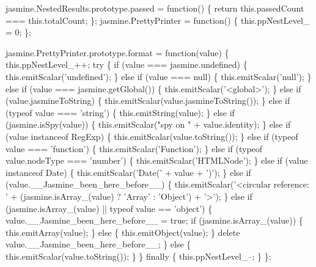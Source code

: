 \begin{DoxyCodeInclude}
jasmine.NestedResults.prototype.passed = \textcolor{keyword}{function}() \{
  \textcolor{keywordflow}{return} this.passedCount === this.totalCount;
\};
jasmine.PrettyPrinter = \textcolor{keyword}{function}() \{
  this.ppNestLevel\_ = 0;
\};

jasmine.PrettyPrinter.prototype.format = \textcolor{keyword}{function}(value) \{
  this.ppNestLevel\_++;
  \textcolor{keywordflow}{try} \{
    \textcolor{keywordflow}{if} (value === jasmine.undefined) \{
      this.emitScalar(\textcolor{stringliteral}{'undefined'});
    \} \textcolor{keywordflow}{else} \textcolor{keywordflow}{if} (value === null) \{
      this.emitScalar(\textcolor{stringliteral}{'null'});
    \} \textcolor{keywordflow}{else} \textcolor{keywordflow}{if} (value === jasmine.getGlobal()) \{
      this.emitScalar(\textcolor{stringliteral}{'<global>'});
    \} \textcolor{keywordflow}{else} \textcolor{keywordflow}{if} (value.jasmineToString) \{
      this.emitScalar(value.jasmineToString());
    \} \textcolor{keywordflow}{else} \textcolor{keywordflow}{if} (typeof value === \textcolor{stringliteral}{'string'}) \{
      this.emitString(value);
    \} \textcolor{keywordflow}{else} \textcolor{keywordflow}{if} (jasmine.isSpy(value)) \{
      this.emitScalar(\textcolor{stringliteral}{"spy on "} + value.identity);
    \} \textcolor{keywordflow}{else} \textcolor{keywordflow}{if} (value instanceof RegExp) \{
      this.emitScalar(value.toString());
    \} \textcolor{keywordflow}{else} \textcolor{keywordflow}{if} (typeof value === \textcolor{stringliteral}{'function'}) \{
      this.emitScalar(\textcolor{stringliteral}{'Function'});
    \} \textcolor{keywordflow}{else} \textcolor{keywordflow}{if} (typeof value.nodeType === \textcolor{stringliteral}{'number'}) \{
      this.emitScalar(\textcolor{stringliteral}{'HTMLNode'});
    \} \textcolor{keywordflow}{else} \textcolor{keywordflow}{if} (value instanceof Date) \{
      this.emitScalar(\textcolor{stringliteral}{'Date('} + value + \textcolor{charliteral}{')'});
    \} \textcolor{keywordflow}{else} \textcolor{keywordflow}{if} (value.\_\_Jasmine\_been\_here\_before\_\_) \{
      this.emitScalar(\textcolor{stringliteral}{'<circular reference: '} + (jasmine.isArray\_(value) ? \textcolor{stringliteral}{'Array'} : \textcolor{stringliteral}{'Object'}) + \textcolor{charliteral}{'>'});
    \} \textcolor{keywordflow}{else} \textcolor{keywordflow}{if} (jasmine.isArray\_(value) || typeof value == \textcolor{stringliteral}{'object'}) \{
      value.\_\_Jasmine\_been\_here\_before\_\_ = \textcolor{keyword}{true};
      \textcolor{keywordflow}{if} (jasmine.isArray\_(value)) \{
        this.emitArray(value);
      \} \textcolor{keywordflow}{else} \{
        this.emitObject(value);
      \}
      \textcolor{keyword}{delete} value.\_\_Jasmine\_been\_here\_before\_\_;
    \} \textcolor{keywordflow}{else} \{
      this.emitScalar(value.toString());
    \}
  \} \textcolor{keywordflow}{finally} \{
    this.ppNestLevel\_--;
  \}
\};


\end{DoxyCodeInclude}
